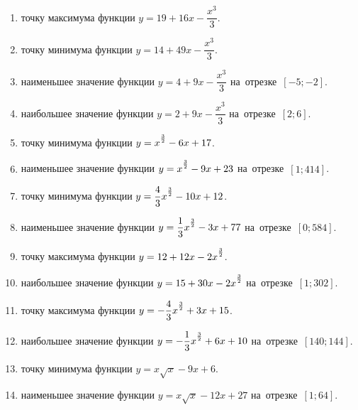 \documentclass[a4paper,10pt]{article}
\begin{document}
\begin{enumerate}
\item {} точку максимума функции $y=19 +16x-\dfrac{x^3}{3}$.

\item {} точку минимума функции $y=14 +49x-\dfrac{x^3}{3}$.

\item {} наименьшее значение функции $y=4 +9x-\dfrac{x^3}{3}$ на~отрезке~$\left[-5;-2\right]$.







\item {} наибольшее значение функции $y=2 +9x-\dfrac{x^3}{3}$ на~отрезке~$\left[2;6\right]$.







\item {} точку минимума функции $y=x\strut^{\frac{3}{2}} -6x+17$.

\item {} наименьшее значение функции $y=x\strut^{\frac{3}{2}} -9x+23$ на~отрезке~$\left[1;414\right]$.

\item {} точку минимума функции $y=\dfrac{4}{3}x\strut^{\frac{3}{2}} -10x+12$.

\item {} наименьшее значение функции $y=\dfrac{1}{3}x\strut^{\frac{3}{2}} -3x+77$ на~отрезке~$\left[0;584\right]$.

\item {} точку максимума функции $y=12+12x-2x\strut^{\frac{3}{2}}$.

\item {} наибольшее значение функции $y=15+30x-2x\strut^{\frac{3}{2}}$ на~отрезке~$\left[1;302\right]$.

\item {} точку максимума функции $y=-\dfrac{4}{3}x\strut^{\frac{3}{2}} +3x+15$.

\item {} наибольшее значение функции $y=-\dfrac{1}{3}x\strut^{\frac{3}{2}} +6x+10$ на~отрезке~$\left[140;144\right]$.

\item {} точку минимума функции $y=x\sqrt{x} -9x+6$.

\item {} наименьшее значение функции $y=x\sqrt{x} -12x+27$ на~отрезке~$\left[1;64\right]$.


\end{enumerate}
\end{document}
